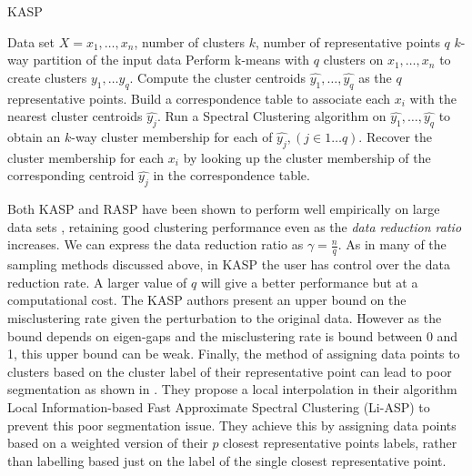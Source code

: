 \begin{algorithm}[h!]
\caption{KASP}
  \begin{algorithmic}[1]
   \REQUIRE Data set $X = {x_1,\ldots, x_n}$, number of clusters $k$, number of representative points $q$
   \ENSURE  $k$-way partition of the input data
   \STATE Perform k-means with $q$ clusters on $x_1, \hdots, x_n$ to create clusters $y_1, \hdots y_q$.
   \STATE Compute the cluster centroids $\widehat{y_1}, \hdots, \widehat{y_q}$ as the $q$ representative points.
   \STATE Build a correspondence table to associate each $x_i$ with the nearest cluster centroids $\widehat{y_j}$.
   \STATE Run a Spectral Clustering algorithm on $\widehat{y_1}, \hdots, \widehat{y_q}$ to obtain an $k$-way cluster membership
   for each of $\widehat{y_j}, (j \in 1 \hdots q)$.
   \STATE Recover the cluster membership for each $x_i$ by looking up the cluster membership of the corresponding centroid $\widehat{y_j}$ in the correspondence table.
  \end{algorithmic}
\label{alg:kasp}
\end{algorithm}

Both KASP and RASP have been shown to perform well empirically on large data sets \citep{Yan2009}, retaining good clustering performance even as the \textit{data reduction ratio} increases. We can express the data reduction ratio as $\gamma = \frac{n}{q}$. As in many of the sampling methods discussed above, in KASP the user has control over the data reduction rate. A larger value of $q$ will give a better performance but at a computational cost. The KASP authors present an upper bound on the misclustering rate given the perturbation to the original data. However as the bound depends on eigen-gaps and the misclustering rate is bound between 0 and 1, this upper bound can be weak. Finally, the method of assigning data points to clusters based on the cluster label of their representative point can lead to poor segmentation as shown in \cite{Cao2014}. They propose a local interpolation in their algorithm Local Information-based Fast Approximate Spectral Clustering (Li-ASP) to prevent this poor segmentation issue. They achieve this by assigning data points based on a weighted version of their $p$ closest representative points labels, rather than labelling based just on the label of the single closest representative point. 
 

